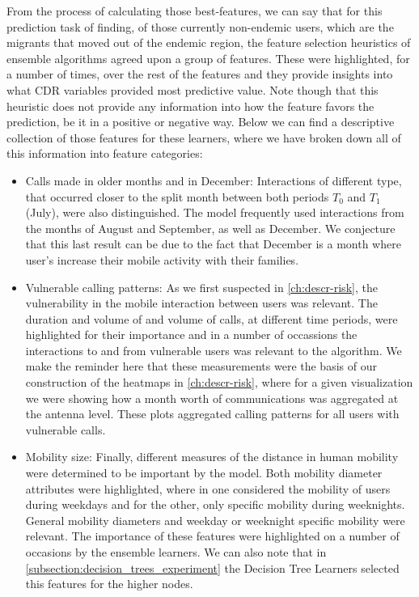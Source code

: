 From the process of calculating those best-features, we can say that for this prediction task of finding, of those currently non-endemic users, which are the migrants that moved out of the endemic region, the feature selection heuristics of ensemble algorithms agreed upon a group of features.
These were highlighted, for a number of times, over the rest of the features and they provide insights into what CDR variables provided most predictive value.
Note though that this heuristic does not provide any information into how the feature favors the prediction, be it in a positive or negative way.
Below we can find a descriptive collection of those features for these learners, where we have broken down all of this information into feature categories:

\begin{itemize}

    \item Calls made in older months and in December: Interactions of different type, that occurred closer to the split month between both periods $T_0$ and $T_1$ (July), were also distinguished.
    The model frequently used interactions from the months of August and September, as well as December.
    We conjecture that this last result can be due to the fact that December is a month where user's increase their mobile activity with their families.

    \item Vulnerable calling patterns: As we first suspected in \cref{ch:descr-risk}, the vulnerability in the mobile interaction between users was relevant.
    The duration and volume of and volume of calls, at different time periods, were highlighted for their importance and in a number of occassions the interactions to and from vulnerable users was relevant to the algorithm.
    We make the reminder here that these measurements were the basis of our construction of the heatmaps in \cref{ch:descr-risk}, where for a given visualization we were showing how a month worth of communications was aggregated at the antenna level.
    These plots aggregated calling patterns for all users with vulnerable calls.

    \item Mobility size: Finally, different measures of the distance in human mobility were determined to be important by the model.
    Both mobility diameter attributes were highlighted, where in one considered the mobility of users during weekdays and for the other, only specific mobility during weeknights.
     General mobility diameters and weekday or weeknight specific mobility were relevant.
     The importance of these features were highlighted on a number of occasions by the ensemble learners.
     We can also note that in \cref{subsection:decision_trees_experiment} the Decision Tree Learners selected this features for the higher nodes.


\end{itemize}

